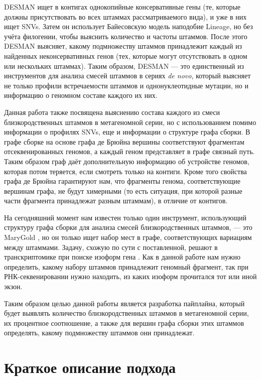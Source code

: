 \documentclass{spbau-diploma}
\begin{document}
DESMAN \cite{DESMAN} ищет в контигах однокопийные консервативные гены (те, которые должны присутствовать во всех штаммах рассматриваемого вида), и уже в них ищет SNVs. Затем он использует Байесовскую модель наподобие Lineage, но без учёта филогении, чтобы выяснить количество и частоты штаммов. После этого DESMAN выясняет, какому подмножеству штаммов принадлежит каждый из найденных неконсервативных генов (тех, которые могут отсутствовать в одном или нескольких штаммах). Таким образом, DESMAN --- это единственный из инструментов для анализа смесей штаммов в сериях \textit{de novo}, который выясняет не только профили встречаемости штаммов и однонуклеотидные мутации, но и информацию о геномном составе каждого их них.

Данная работа также посвящена выяснению состава каждого из смеси близкородственных штаммов в метагеномной серии, но с использованием помимо информации о профилях SNVs, еще и информации о структуре графа сборки. В графе сборке на основе графа де Брюйна \cite{de_Bruijn} вершины соответствуют фрагментам отсеквенированных геномов, а каждый геном представляет в графе связный путь. Таким образом граф даёт дополнительную информацию об устройстве геномов, которая потом теряется, если смотреть только на контиги. Кроме того свойства графа де Брюйна гарантируют нам, что фрагменты генома, соответствующие вершинам графа, не будут химерными (то есть ситуация, при которой разные части фрагмента принадлежат разным штаммам), в отличие от контигов.

На сегодняшний момент нам известен только один инструмент, использующий структуру графа сборки для анализа смесей близкородственных штаммов, --- это MaryGold \cite{MaryGold}, но он только ищет набор мест в графе, соответствующих вариациям между штаммами. Задачу, схожую по сути с поставленной, решают в транскриптомике при поиске изоформ гена \cite{flipflop2, other_flows, flipflop1}. Как в данной работе нам нужно определить, какому набору штаммов принадлежит геномный фрагмент, так при РНК-секвенировании нужно находить, из каких изоформ прочитался тот или иной экзон.

Таким образом целью данной работы является разработка пайплайна, который будет выявлять количество близкородственных штаммов в метагеномной серии, их процентное соотношение, а также для вершин графа сборки этих штаммов определять, какому подмножеству штаммов они принадлежат.


\section{Краткое описание подхода}
\end{document}
